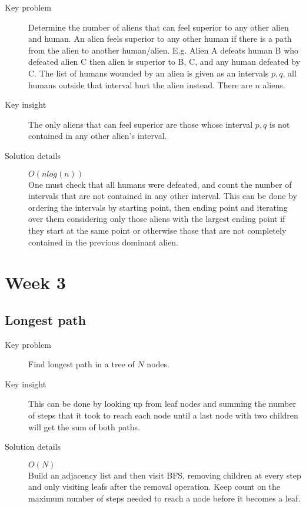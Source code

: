 \documentclass[11pt]{book}
\begin{document}
\begin{description}
	\item[Key problem] Determine the number of aliens that can feel superior to any other alien and human. An alien feels superior to any other human if there is a path from the alien to another human/alien. E.g. Alien A defeats human B who defeated alien C then alien is superior to B, C, and any human defeated by C. The list of humans wounded by an alien is given as an intervals $p,q$, all humans outside that interval hurt the alien instead. There are $n$ aliens.
	\item[Key insight] The only aliens that can feel superior are those whose interval $p,q$ is not contained in any other alien's interval.
	\item[Solution details] $O(nlog(n))$ \\ One must check that all humans were defeated, and count the number of intervals that are not contained in any other interval. This can be done by ordering the intervals by starting point, then ending point and iterating over them considering only those aliens with the largest ending point if they start at the same point or otherwise those that are not completely contained in the previous dominant alien.
\end{description}

\section{Week 3}

\subsection{Longest path}

\begin{description}
	\item[Key problem] Find longest path in a tree of $N$ nodes.
	\item[Key insight] This can be done by looking up from leaf nodes and summing the number of steps that it took to reach each node until a last node with two children will get the sum of both paths.
	\item[Solution details] $O(N)$ \\ Build an adjacency list and then visit BFS, removing children at every step and only visiting leafs after the removal operation. Keep count on the maximum number of steps needed to reach a node before it becomes a leaf.
\end{description}
\end{document}

